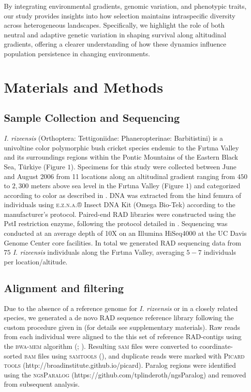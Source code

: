 \documentclass[9pt,a4paper,twoside]{rho-class/rho}
\begin{document}
    By integrating environmental gradients, genomic variation, and phenotypic traits, our study provides insights into how selection maintains intraspecific diversity across heterogeneous landscapes. Specifically, we highlight the role of both neutral and adaptive genetic variation in shaping survival along altitudinal gradients, offering a clearer understanding of how these dynamics influence population persistence in changing environments.

\section{Materials and Methods}

    \subsection{Sample Collection and Sequencing}

       \textit{I. rizeensis} (Orthoptera: Tettigoniidae: Phaneropterinae: Barbitistini) is a univoltine color polymorphic bush cricket species endemic to the Fırtına Valley and its surroundings regions within the Pontic Mountains of the Eastern Black Sea, Türkiye (Figure $1$). Specimens for this study were collected between June and August 2006 from 11 locations along an altitudinal gradient ranging from $450$ to $2,300$ meters above sea level in the Fırtına Valley (Figure $1$) and categorized according to color as described in \cite{Çağlar2014}. DNA was extracted from the hind femura of individuals using \textsc{e.z.n.a.}® Insect DNA Kit (Omega Bio-Tek) according to the manufacturer’s protocol. Paired-end RAD libraries were constructed using the PstI restriction enzyme, following the protocol detailed in \cite{Ali2016}. Sequencing was conducted at an average depth of 10X on an Illumina HiSeq4000 at the UC Davis Genome Center core facilities. In total we generated RAD sequencing data from $75$ \textit{I. rizeensis} individuals along the Fırtına Valley, averaging $5-7$ individuals per location/altitude.
    
    \subsection{Alignment and filtering}

        Due to the absence of a reference genome for \textit{I. rizeensis} or in a closely related species, we generated a de novo RAD sequence reference library following the custom procedure given in \cite{SağlamMolEcol2016} (for details see supplementary materials). Raw reads from each individual were aligned to the this set of reference RAD-contigs using the \textsc{bwa-mem} algorithm (\cite{Li2010}; \cite{Li2013}). Resulting \textsc{sam} files were converted to coordinate-sorted \textsc{bam} files using \textsc{samtools} (\cite{Danecek2021}), and duplicate reads were marked with \textsc{Picard tools} (http://broadinstitute.github.io/picard). Paralog regions were identified using the \textsc{ngsParalog} (https://github.com/tplinderoth/ngsParalog) and removed from subsequent analysis.
\end{document}
